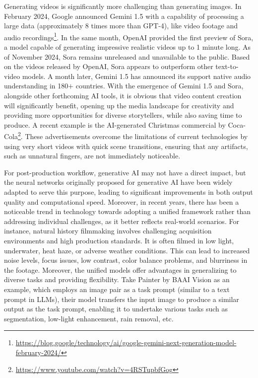 \documentclass[11pt,a4paper]{article}
\begin{document}
Generating videos is significantly more challenging than generating images. In February 2024, Google announced Gemini 1.5 with a capability of processing a large data (approximately 8 times more than GPT-4), like video footage and audio recordings\footnote{\url{https://blog.google/technology/ai/google-gemini-next-generation-model-february-2024/}}. In the same month, OpenAI provided the first preview of Sora,  %
a model capable of generating impressive realistic videos up to 1 minute long. As of November 2024, Sora remains unreleased and unavailable to the public. Based on the videos released by OpenAI, Sora appears to outperform other text-to-video models. A month later, Gemini 1.5 has announced its support native audio understanding in 180$+$ countries.  With the emergence of Gemini 1.5 and Sora, alongside other forthcoming AI tools, it is obvious that video content creation will significantly benefit, opening up the media landscape for creativity and providing more opportunities for diverse storytellers, while also saving time to produce. A recent example is the AI-generated Christmas commercial by Coca-Cola\footnote{\url{https://www.youtube.com/watch?v=4RSTupbfGog}}. These advertisements overcome the limitations of current technologies by using very short videos with quick scene transitions, ensuring that any artifacts, such as unnatural fingers, are not immediately noticeable.

For post-production workflow, generative AI may not have a direct impact, but the neural networks originally proposed for generative AI have been widely adapted to serve this purpose, leading to significant improvements in both output quality and computational speed. Moreover, in recent years, there has been a noticeable trend in technology towards adopting a unified framework rather than addressing individual challenges, as it better reflects real-world scenarios. For instance, natural history filmmaking involves challenging acquisition environments and high production standards. It is often filmed in low light, underwater, heat haze, or adverse weather conditions. This can lead to increased noise levels, focus issues, low contrast, color balance problems, and blurriness in the footage. Moreover, the unified models offer advantages in generalizing to diverse tasks and providing flexibility. Take Painter by BAAI Vision \cite{Wang:Painter:2023} as an example, which employs an image pair as a task prompt (similar to a text prompt in LLMs), their model transfers the input image to produce a similar output as the task prompt, enabling it to undertake various tasks such as segmentation, low-light enhancement, rain removal, etc.
\end{document}
